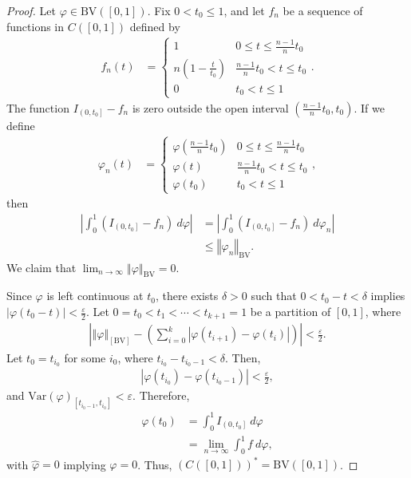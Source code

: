 \documentclass[12pt]{extarticle}
\newcommand{\norm}[1]{\left\Vert #1\right\Vert}
\newcommand{\ve}{\varepsilon}
\theoremstyle{plain}
\theoremstyle{definition}
\theoremstyle{note}
\renewcommand{\newline}{\hfill\break}
\begin{document}
\begin{proof}
  Let $\varphi \in \text{BV}\left([0,1]\right)$. Fix $0 < t_0 \leq 1$, and let $f_n$ be a sequence of functions in $C\left([0,1]\right)$ defined by
  \begin{align*}
    f_n\left(t\right) &= \begin{cases}
      1 & 0 \leq t \leq \frac{n-1}{n}t_0\\
      n\left(1 - \frac{t}{t_0}\right) & \frac{n-1}{n}t_0 < t \leq t_0\\
      0 & t_0 < t \leq 1
    \end{cases}.
  \end{align*}
  The function $I_{\left(0,t_0\right]} - f_n$ is zero outside the open interval $\left(\frac{n-1}{n}t_0,t_0\right)$. If we define
  \begin{align*}
    \varphi_n(t) &= \begin{cases}
      \varphi\left(\frac{n-1}{n}t_0\right) & 0 \leq t \leq \frac{n-1}{n}t_0\\
      \varphi(t) & \frac{n-1}{n}t_0 < t \leq t_0\\
      \varphi\left(t_0\right) & t_0 < t \leq 1
    \end{cases},
  \end{align*}
  then
  \begin{align*}
    \left\vert \int_{0}^{1} \left(I_{\left(0,t_0\right]} - f_n\right)\:d\varphi \right\vert &= \left\vert \int_{0}^{1} \left(I_{\left(0,t_0\right]} - f_n\right)\:d\varphi_n \right\vert\\
                                                                                            &\leq \norm{\varphi_n}_{\text{BV}}.
  \end{align*}
  We claim that $\lim_{n\rightarrow\infty}\norm{\varphi}_{\text{BV}} = 0$.\newline

  Since $\varphi$ is left continuous at $t_0$, there exists $\delta > 0$ such that $0 < t_0 - t < \delta$ implies $\left\vert \varphi(t_0 - t) \right\vert < \frac{\ve}{2}$. Let $0 = t_0 < t_1 < \cdots < t_{k+1} = 1$ be a partition of $[0,1]$, where
  \begin{align*}
    \left\vert\norm{\varphi}_[\text{BV}] - \left(\sum_{i=0}^{k}\left\vert \varphi(t_{i+1}) - \varphi(t_i) \right\vert\right)\right\vert < \frac{\ve}{2}.
  \end{align*}
  Let $t_0 = t_{i_0}$ for some $i_0$, where $t_{i_0} - t_{i_0 - 1} < \delta$. Then,
  \begin{align*}
    \left\vert \varphi\left(t_{i_0}\right) - \varphi\left(t_{i_0 - 1}\right) \right\vert < \frac{\ve}{2},
  \end{align*}
  and $\text{Var}\left(\varphi\right)_{\left[t_{i_0 - 1} ,t_{i_0}\right]} < \ve$. Therefore,
  \begin{align*}
    \varphi\left(t_0\right) &= \int_{0}^{1} I_{\left(0,t_0\right]}\:d\varphi\\
                            &= \lim_{n\rightarrow\infty}\int_{0}^{1} f\:d\varphi,
  \end{align*}
  with $\hat{\varphi} = 0$ implying $\varphi = 0$. Thus, $\left(C\left([0,1]\right)\right)^{\ast} = \text{BV}\left([0,1]\right)$.
\end{proof}
\end{document}
